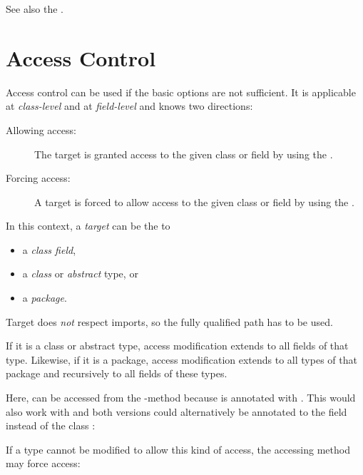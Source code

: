 See also the .

\section{Access Control}
\label{lf-access-control}

Access control can be used if the basic  options are not sufficient. It is applicable at \emph{class-level} and at \emph{field-level} and knows two directions:

\begin{description}
	\item[Allowing access:] The target is granted access to the given class or field by using the  .
	\item[Forcing access:] A target is forced to allow access to the given class or field by using the  .
\end{description}

In this context, a \emph{target} can be the  to

\begin{itemize}
	\item a \emph{class field},
	\item a \emph{class} or \emph{abstract} type, or
	\item a \emph{package}.
\end{itemize}

Target does \emph{not} respect imports, so the fully qualified path has to be used.

If it is a class or abstract type, access modification extends to all fields of that type. Likewise, if it is a package, access modification extends to all types of that package and recursively to all fields of these types.


Here,  can be accessed from the -method because  is annotated with . This would also work with  and both versions could alternatively be annotated to the field  instead of the class :


If a type cannot be modified to allow this kind of access, the accessing method may force access:

